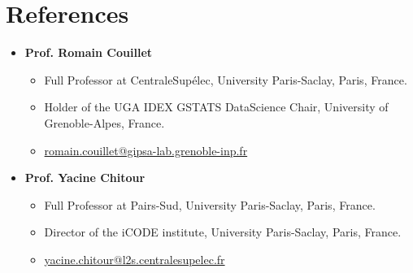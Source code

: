\documentclass[a4paper,10pt]{article}
\begin{document}
\section{References}
\begin{itemize}\parskip=0cm
  \item \textbf{Prof. Romain Couillet} 
  \begin{itemize}\parskip=0cm
    \item Full Professor at CentraleSup{\'e}lec, University Paris-Saclay, Paris, France.
    \item Holder of the UGA IDEX GSTATS DataScience Chair, University of Grenoble-Alpes, France.
    \item {} \href{mailto:romain.couillet@gipsa-lab.grenoble-inp.fr}{romain.couillet@gipsa-lab.grenoble-inp.fr} %
  \end{itemize}
  \item \textbf{Prof. Yacine Chitour}
  \begin{itemize}\parskip=0cm
    \item Full Professor at Pairs-Sud, University Paris-Saclay, Paris, France.
    \item Director of the iCODE institute, University Paris-Saclay, Paris, France.
    \item {} \href{mailto:yacine.chitour@l2s.centralesupelec.fr}{yacine.chitour@l2s.centralesupelec.fr}
  \end{itemize}
\end{itemize}
\end{document}
